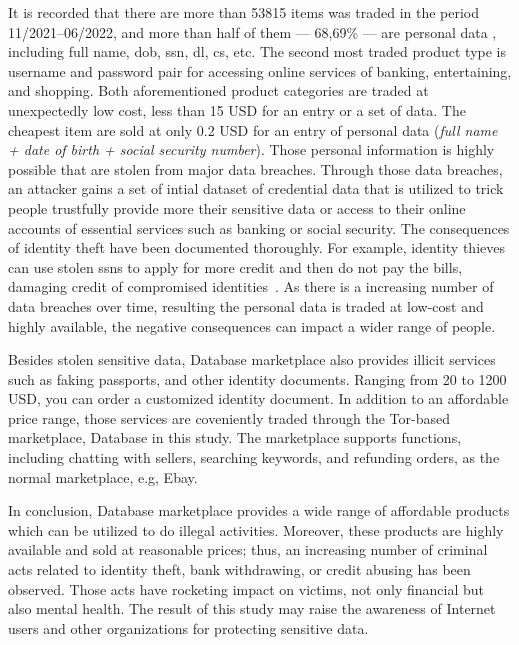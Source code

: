 It is recorded that there are more than 53815 items was traded in the period
11/2021--06/2022, and more than half of them --- 68,69\% --- are personal data
, including full name, \acrlong{dob}, \acrlong{ssn}, \acrlong{dl}, \acrlong{cs},
etc. The second
most traded product type is username and password pair for accessing online
services of banking, entertaining, and shopping. Both aforementioned product
categories are traded at unexpectedly low cost, less than 15 USD for an entry or
a set of data. The cheapest item are sold at only 0.2 USD for an entry of personal
data (\emph{full name + date of birth + social security number}). Those personal
information is highly possible that are stolen from major data breaches. Through
those data breaches, an attacker gains a set of intial dataset of credential data
that is utilized to trick people trustfully provide more their sensitive data or
access to their online accounts of essential services such as banking or social
security. The consequences of identity theft have been documented thoroughly.
For example, identity thieves can use stolen \acrshort{ssn}s to apply for more
credit and then do not pay the bills, damaging credit of compromised identities~\cite{web:identity_theft}.
As there is a increasing number of data breaches over time, resulting the personal
data is traded at low-cost and highly available, the negative consequences can impact
a wider range of people.

Besides stolen sensitive data, Database marketplace also provides illicit services
such as faking passports, and other identity documents. Ranging from 20 to 1200 USD,
you can order a customized identity document. In addition to an affordable price range,
those services are coveniently traded through the Tor-based marketplace, Database in
this study. The marketplace supports functions, including chatting with sellers, 
searching keywords, and refunding orders, as the normal marketplace, e.g, Ebay.

In conclusion, Database marketplace provides a wide range of affordable products which
can be utilized to do illegal activities. Moreover, these products are highly
available and sold at reasonable prices; thus, an increasing number of criminal
acts related to identity theft, bank withdrawing, or credit abusing has been
observed. Those acts have rocketing impact on victims, not only financial but
also mental health. The result of this study may raise the awareness of Internet
users and other organizations for protecting sensitive data.
